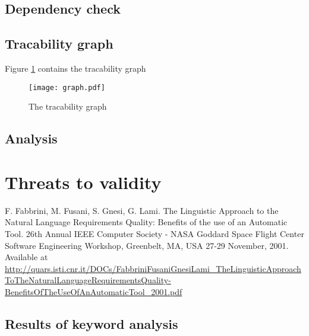 \documentclass[a4paper,twoside,11pt]{article}
\begin{document}
\subsection{Dependency check}


\subsection{Tracability graph}
Figure \ref{trac_graph} contains the tracability graph
\begin{figure}[h]
\texttt{[image: graph.pdf]}
\label{trac_graph}
\centering
\caption{The tracability graph}
\end{figure}
\subsection{Analysis}

\section{Threats to validity}

\begin{thebibliography}{9}
F. Fabbrini, M. Fusani, S. Gnesi, G. Lami. The Linguistic Approach to the Natural Language Requirements Quality: Benefits of the use of an Automatic Tool. 26th Annual IEEE Computer Society - NASA Goddard Space Flight Center Software Engineering Workshop, Greenbelt, MA, USA 27-29 November, 2001. Available at \url{http://quars.isti.cnr.it/DOCs/FabbriniFusaniGnesiLami\_TheLinguisticApproachToTheNaturalLanguageRequirementsQuality-BenefitsOfTheUseOfAnAutomaticTool\_2001.pdf}
 \end{thebibliography}

\newpage
\begin{appendices}
\section{Results of keyword analysis} \label{appendix:analysis}

\noindent	
\end{appendices}
\end{document}
